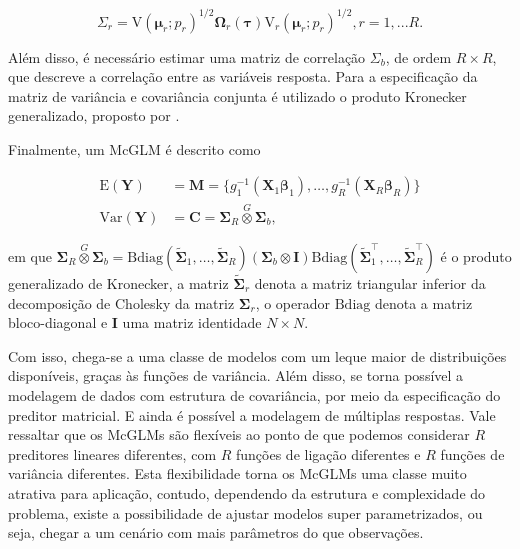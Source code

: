 $$
\Sigma_r =
\mathrm{V}\left(\boldsymbol{\mu}_r; p_r\right)^{1/2}\boldsymbol{\Omega}_r\left(\boldsymbol{\tau}\right)\mathrm{V}_r\left(\boldsymbol{\mu}_r; p_r\right)^{1/2}, r=1,...R.
$$

Além disso, é necessário estimar uma matriz de correlação $\Sigma_b$, de ordem $R \times R$, que descreve a correlação entre as variáveis resposta. Para a especificação da matriz de variância e covariância conjunta é utilizado o produto Kronecker generalizado, proposto por \citet{martinez13}.

Finalmente, um McGLM é descrito como

$$
\label{eq:mcglm}
      \begin{aligned}
        \mathrm{E}(\boldsymbol{Y}) &=
          \boldsymbol{M} =
            \{g_1^{-1}(\boldsymbol{X}_1 \boldsymbol{\beta}_1),
            \ldots,
            g_R^{-1}(\boldsymbol{X}_R \boldsymbol{\beta}_R)\}
          \\
        \mathrm{Var}(\boldsymbol{Y}) &=
          \boldsymbol{C} =
            \boldsymbol{\Sigma}_R \overset{G} \otimes
            \boldsymbol{\Sigma}_b,
      \end{aligned}
$$

\noindent em que $\boldsymbol{\Sigma}_R \overset{G} \otimes \boldsymbol{\Sigma}_b = \mathrm{Bdiag}(\tilde{\boldsymbol{\Sigma}}_1, \ldots, \tilde{\boldsymbol{\Sigma}}_R) (\boldsymbol{\Sigma}_b \otimes \boldsymbol{I}) \mathrm{Bdiag}(\tilde{\boldsymbol{\Sigma}}_1^\top, \ldots, \tilde{\boldsymbol{\Sigma}}_R^\top)$ é o produto generalizado de Kronecker, a matriz $\tilde{\boldsymbol{\Sigma}}_r$ denota a matriz triangular inferior da decomposição de Cholesky da matriz ${\boldsymbol{\Sigma}}_r$, o operador $\mathrm{Bdiag}$ denota a matriz bloco-diagonal e $\boldsymbol{I}$ uma matriz identidade $N \times N$. 

Com isso, chega-se a uma classe de modelos com um leque maior de distribuições disponíveis, graças às funções de variância. Além disso, se torna possível a modelagem de dados com estrutura de covariância, por meio da especificação do preditor matricial. E ainda é possível a modelagem de múltiplas respostas. Vale ressaltar que os McGLMs são flexíveis ao ponto de que podemos considerar $R$ preditores lineares diferentes, com $R$ funções de ligação diferentes e $R$ funções de variância diferentes. Esta flexibilidade torna os McGLMs uma classe muito atrativa para aplicação, contudo, dependendo da estrutura e complexidade do problema, existe a possibilidade de ajustar modelos super parametrizados, ou seja, chegar a um cenário com mais parâmetros do que observações. 

